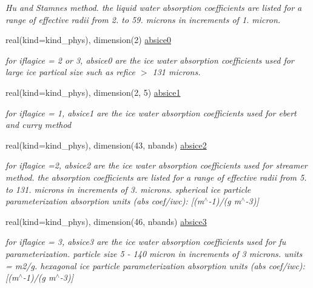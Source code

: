 \begin{DoxyCompactItemize}
\begin{DoxyCompactList}\small\item\em Hu and Stamnes method. the liquid water absorption coefficients are listed for a range of effective radii from 2. to 59. microns in increments of 1. micron. \end{DoxyCompactList}\item 
real(kind=kind\+\_\+phys), dimension(2) \hyperlink{namespacemodule__radlw__cldprlw_a6610d37cab9ccd4de89237c5de536cfb}{absice0}
\begin{DoxyCompactList}\small\item\em for iflagice = 2 or 3, absice0 are the ice water absorption coefficients used for large ice partical size such as refice $>$ 131 microns. \end{DoxyCompactList}\item 
real(kind=kind\+\_\+phys), dimension(2, 5) \hyperlink{namespacemodule__radlw__cldprlw_a3b86ff9d6791d95170d3b3ab61cd8291}{absice1}
\begin{DoxyCompactList}\small\item\em for iflagice = 1, absice1 are the ice water absorption coefficients used for ebert and curry method \end{DoxyCompactList}\item 
real(kind=kind\+\_\+phys), dimension(43, nbands) \hyperlink{namespacemodule__radlw__cldprlw_ad2238686c0e6d1c5d74bcfdde1542e1d}{absice2}
\begin{DoxyCompactList}\small\item\em for iflagice =2, absice2 are the ice water absorption coefficients used for streamer method. the absorption coefficients are listed for a range of effective radii from 5. to 131. microns in increments of 3. microns. spherical ice particle parameterization absorption units (abs coef/iwc)\+: \mbox{[}(m$^\wedge$-\/1)/(g m$^\wedge$-\/3)\mbox{]} \end{DoxyCompactList}\item 
real(kind=kind\+\_\+phys), dimension(46, nbands) \hyperlink{namespacemodule__radlw__cldprlw_a3aa04541d0b809367f88ef8aa0eafdbb}{absice3}
\begin{DoxyCompactList}\small\item\em for iflagice = 3, absice3 are the ice water absorption coefficients used for fu parameterization. particle size 5 -\/ 140 micron in increments of 3 microns. units = m2/g. hexagonal ice particle parameterization absorption units (abs coef/iwc)\+: \mbox{[}(m$^\wedge$-\/1)/(g m$^\wedge$-\/3)\mbox{]} \end{DoxyCompactList}\end{DoxyCompactItemize}


